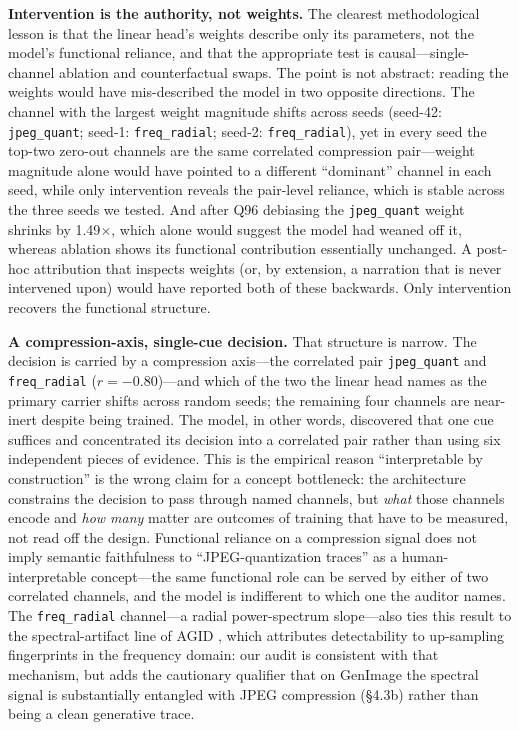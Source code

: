 \textbf{Intervention is the authority, not weights.} The clearest methodological lesson is that the linear head's weights describe only its parameters, not the model's functional reliance, and that the appropriate test is causal---single-channel ablation and counterfactual swaps. The point is not abstract: reading the weights would have mis-described the model in two opposite directions. The channel with the largest weight magnitude shifts across seeds (seed-42: \texttt{jpeg\_quant}; seed-1: \texttt{freq\_radial}; seed-2: \texttt{freq\_radial}), yet in every seed the top-two zero-out channels are the same correlated compression pair---weight magnitude alone would have pointed to a different ``dominant'' channel in each seed, while only intervention reveals the pair-level reliance, which is stable across the three seeds we tested. And after Q96 debiasing the \texttt{jpeg\_quant} weight shrinks by 1.49\ensuremath{\times}, which alone would suggest the model had weaned off it, whereas ablation shows its functional contribution essentially unchanged. A post-hoc attribution that inspects weights (or, by extension, a narration that is never intervened upon) would have reported both of these backwards. Only intervention recovers the functional structure.

\textbf{A compression-axis, single-cue decision.} That structure is narrow. The decision is carried by a compression axis---the correlated pair \texttt{jpeg\_quant} and \texttt{freq\_radial} ($r = -0.80$)---and which of the two the linear head names as the primary carrier shifts across random seeds; the remaining four channels are near-inert despite being trained. The model, in other words, discovered that one cue suffices and concentrated its decision into a correlated pair rather than using six independent pieces of evidence. This is the empirical reason ``interpretable by construction'' is the wrong claim for a concept bottleneck: the architecture constrains the decision to pass through named channels, but \emph{what} those channels encode and \emph{how many} matter are outcomes of training that have to be measured, not read off the design. Functional reliance on a compression signal does not imply semantic faithfulness to ``JPEG-quantization traces'' as a human-interpretable concept---the same functional role can be served by either of two correlated channels, and the model is indifferent to which one the auditor names. The \texttt{freq\_radial} channel---a radial power-spectrum slope---also ties this result to the spectral-artifact line of AGID \citep{frank2020dctgan, durall2020watch}, which attributes detectability to up-sampling fingerprints in the frequency domain: our audit is consistent with that mechanism, but adds the cautionary qualifier that on GenImage the spectral signal is substantially entangled with JPEG compression (\S{}4.3b) rather than being a clean generative trace.

